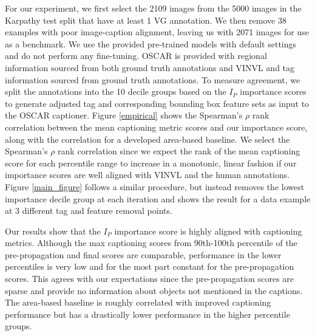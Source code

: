 \documentclass[10pt,twocolumn,letterpaper]{article}
\begin{document}
For our experiment, we first select the 2109 images from the 5000 images in the Karpathy test split \cite{karp2015} that have at least 1 VG annotation. We then remove 38 examples with poor image-caption alignment, leaving us with 2071 images for use as a benchmark. We use the provided pre-trained models with default settings and do not perform any fine-tuning. OSCAR is provided with regional information sourced from both ground truth annotations and VINVL \cite{vinvl2021} and tag information sourced from ground truth annotations. To measure agreement, we split the annotations into the 10 decile groups based on the $I_{P}$ importance scores to generate adjusted tag and corresponding bounding box feature sets as input to the OSCAR captioner. Figure \ref{empirical} shows the Spearman's $\rho$ rank correlation between the mean captioning metric scores and our importance score, along with the correlation for a developed area-based baseline. We select the Spearman's $\rho$ rank correlation since we expect the rank of the mean captioning score for each percentile range to increase in a monotonic, linear fashion if our importance scores are well aligned with VINVL and the human annotations. Figure \ref{main_figure} follows a similar procedure, but instead removes the lowest importance decile group at each iteration and shows the result for a data example at 3 different tag and feature removal points.
\par
Our results show that the $I_P$ importance score is highly aligned with captioning metrics. Although the max captioning scores from 90th-100th percentile of the pre-propagation and final scores are comparable, performance in the lower percentiles is very low and for the most part constant for the pre-propagation scores. This agrees with our expectations since the pre-propagation scores are sparse and provide no information about objects not mentioned in the captions. The area-based baseline is roughly correlated with improved captioning performance but has a drastically lower performance in the higher percentile groups.
\end{document}
